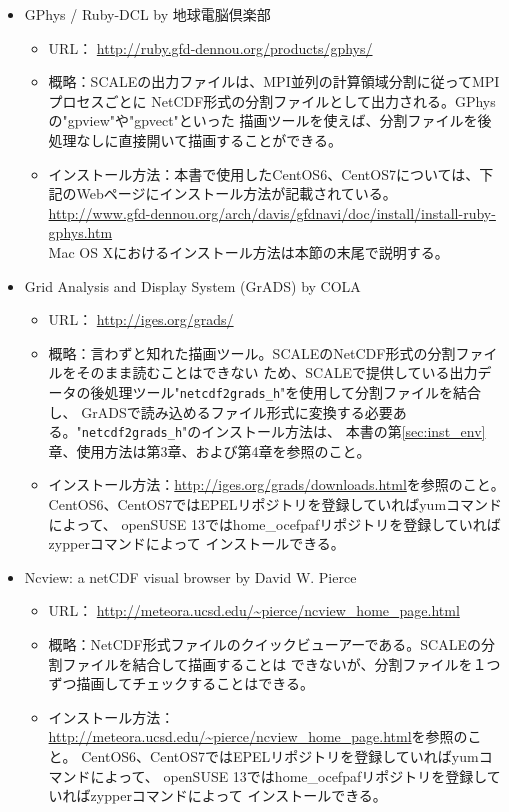 \begin{itemize}
\item GPhys / Ruby-DCL by 地球電脳倶楽部\\
 \begin{itemize}
  \item URL： \url{http://ruby.gfd-dennou.org/products/gphys/}
  \item 概略：SCALEの出力ファイルは、MPI並列の計算領域分割に従ってMPIプロセスごとに
              NetCDF形式の分割ファイルとして出力される。GPhysの"gpview"や"gpvect"といった
              描画ツールを使えば、分割ファイルを後処理なしに直接開いて描画することができる。
  \item インストール方法：本書で使用したCentOS6、CentOS7については、下記のWebページにインストール方法が記載されている。\\
                        \url{http://www.gfd-dennou.org/arch/davis/gfdnavi/doc/install/install-ruby-gphys.htm}\\
                        Mac OS Xにおけるインストール方法は本節の末尾で説明する。
 \end{itemize}
\item Grid Analysis and Display System (GrADS) by COLA\\
 \begin{itemize}
  \item URL： \url{http://iges.org/grads/}
  \item 概略：言わずと知れた描画ツール。SCALEのNetCDF形式の分割ファイルをそのまま読むことはできない
             ため、SCALEで提供している出力データの後処理ツール"\verb|netcdf2grads_h|"を使用して分割ファイルを結合し、
             GrADSで読み込めるファイル形式に変換する必要ある。"\verb|netcdf2grads_h|"のインストール方法は、
本書の第\ref{sec:inst_env}章、使用方法は第3章、および第4章を参照のこと。
  \item インストール方法：\url{http://iges.org/grads/downloads.html}を参照のこと。
                        CentOS6、CentOS7ではEPELリポジトリを登録していればyumコマンドによって、
                        openSUSE 13ではhome\_ocefpafリポジトリを登録していればzypperコマンドによって
                        インストールできる。
 \end{itemize}
\item Ncview: a netCDF visual browser by David W. Pierce\\
 \begin{itemize}
  \item URL： \url{http://meteora.ucsd.edu/~pierce/ncview_home_page.html}
  \item 概略：NetCDF形式ファイルのクイックビューアーである。SCALEの分割ファイルを結合して描画することは
             できないが、分割ファイルを１つずつ描画してチェックすることはできる。
  \item インストール方法：\url{http://meteora.ucsd.edu/~pierce/ncview_home_page.html}を参照のこと。
                        CentOS6、CentOS7ではEPELリポジトリを登録していればyumコマンドによって、
                        openSUSE 13ではhome\_ocefpafリポジトリを登録していればzypperコマンドによって
                        インストールできる。
 \end{itemize}
\end{itemize}

